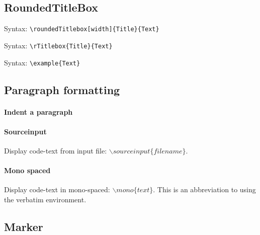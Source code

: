 \documentclass[a4paper,12pt]{article}
\begin{document}
\subsection{RoundedTitleBox}

Syntax: \verb|\roundedTitlebox[width]{Title}{Text}|


Syntax: \verb|\rTitlebox{Title}{Text}|


Syntax: \verb|\example{Text}|



\subsection{Paragraph formatting}

\paragraph{Indent a paragraph} 


\paragraph{Sourceinput} 

Display code-text from input file: $\backslash sourceinput\{filename\}$. 

\paragraph{Mono spaced}

Display code-text in mono-spaced: $\backslash mono\{text\}$. This is an abbreviation to using the verbatim environment.

\subsection{Marker}
\end{document}
